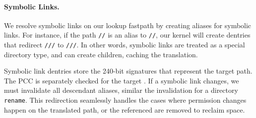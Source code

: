 
\paragraph{Symbolic Links.}  We resolve symbolic links on our lookup fastpath
by creating \dentry{} aliases for symbolic links.
For instance, if the path {\tt /\fnone{}/\lnone{}} is an alias to {\tt /\fnone{}/\fntwo{}},
our kernel will create dentries that redirect {\tt /\fnone{}/\lnone{}/\fnthree{}} to {\tt /\fnone{}/\fntwo{}/\fnthree{}}.
In other words, symbolic links are treated as a special directory type, and can create children,
caching the translation.

Symbolic link dentries store the 240-bit signatures that represent the target path.
The PCC is separately checked for the target \dentry{}.
If a symbolic link changes, we must invalidate all descendant aliases,
similar the invalidation for a directory {\tt rename}.
This redirection seamlessly handles the cases where
permission changes happen on the translated path,
or the referenced \dentries{} are removed to reclaim space.






